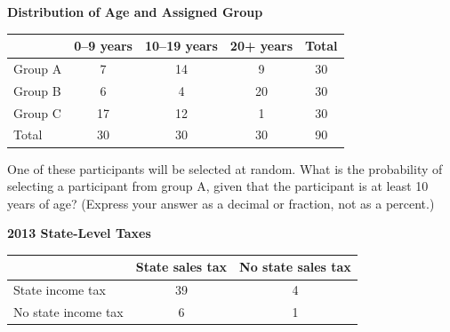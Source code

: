 \vspace{0.75em}

\vspace{2em}


\noindent\markforreview

\begin{center}
    

\textbf{Distribution of Age and Assigned Group}

\vspace{0.5em}

\begin{tabular}{|l|c|c|c|c|}
\hline
 & 0--9 years & 10--19 years & 20+ years & Total \\
\hline
Group A & 7 & 14 & 9 & 30 \\
Group B & 6 & 4 & 20 & 30 \\
Group C & 17 & 12 & 1 & 30 \\
\hline
Total & 30 & 30 & 30 & 90 \\
\hline
\end{tabular}
\end{center}

\vspace{1em}

One of these participants will be selected at random.  
What is the probability of selecting a participant from group A, given that the participant is at least 10 years of age?  
(Express your answer as a decimal or fraction, not as a percent.)

\vspace{0.75em}


\vspace{2em}


\newpage
\noindent\markforreview


\begin{center}
    

\textbf{2013 State-Level Taxes}

\vspace{0.5em}

\begin{tabular}{|l|c|c|}
\hline
 & State sales tax & No state sales tax \\
\hline
State income tax & 39 & 4 \\
No state income tax & 6 & 1 \\
\hline
\end{tabular}
\end{center}

\vspace{1em}

